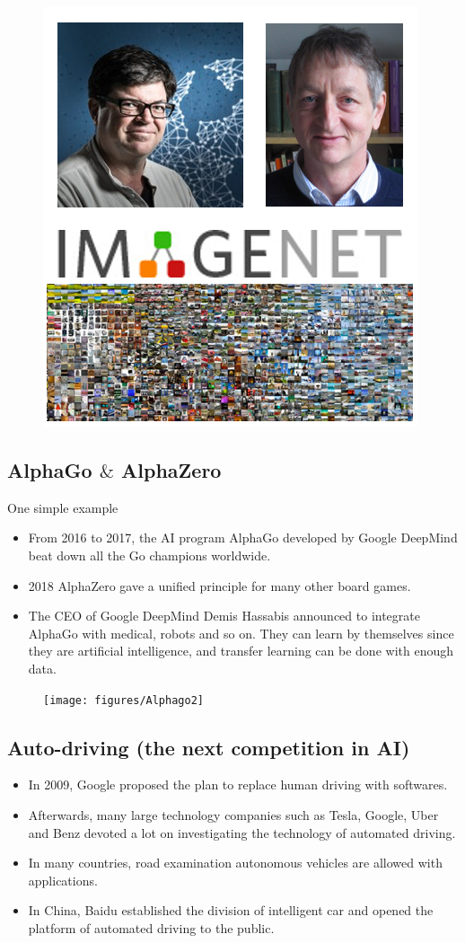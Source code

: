 \begin{figure}
\centering
\includegraphics[width=.6\textwidth]{figures/ImageNet}
\end{figure}


\subsection{AlphaGo $\&$ AlphaZero}
One simple example
\begin{itemize}
	\item From 2016 to 2017, the AI program AlphaGo developed by Google DeepMind beat down all the Go champions worldwide.

    \item 2018 AlphaZero gave a unified principle for many other board games.
    \item The CEO of Google DeepMind Demis Hassabis announced to integrate AlphaGo with medical, robots and so on. They can learn by themselves since they are artificial intelligence, and transfer learning can be done with enough data.
\end{itemize}

\begin{figure}
\centering
\texttt{[image: figures/Alphago2]}
\end{figure}

\subsection{Auto-driving (the next competition in AI)}
\begin{itemize}
\item In 2009, Google proposed the plan to replace human driving with softwares.

\item Afterwards, many large technology companies such as Tesla, Google, Uber and Benz devoted a lot on investigating the technology of automated driving.

\item In many countries, road examination autonomous vehicles are allowed with applications.

\item In China, Baidu established the division of intelligent car and opened the platform of automated driving to the public.

\end{itemize}


